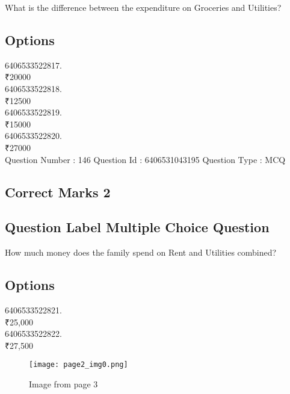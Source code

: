 \documentclass{article}
\begin{document}
What is the difference between the expenditure on Groceries and Utilities?\\

\subsection{Options }

6406533522817.\\

₹20000\\

6406533522818.\\

₹12500\\

6406533522819.\\

₹15000\\

6406533522820.\\

₹27000\\

Question Number : 146 Question Id : 6406531043195 Question Type : MCQ\\

\subsection{Correct Marks  2}

\subsection{Question Label  Multiple Choice Question}

How much money does the family spend on Rent and Utilities combined?\\

\subsection{Options }

6406533522821.\\

₹25,000\\

6406533522822.\\

₹27,500\\

\newpage
\begin{figure}[h]
\centering
\texttt{[image: page2\_img0.png]}
\caption{Image from page 3}
\end{figure}
\end{document}
